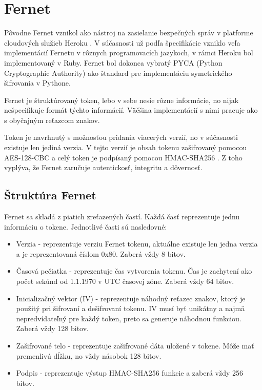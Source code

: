 \section{Fernet}

Pôvodne Fernet vznikol ako nástroj na zasielanie bezpečných správ v platforme cloudových služieb Heroku \cite{fernet_legacy}. V súčasnosti už podľa špecifikácie \cite{fernet_spec} vzniklo veľa implementácií Fernetu v rôznych programovacích jazykoch\cite{fernet_cpp, fernet_haskell}, v rámci Heroku bol implementovaný v Ruby. Fernet bol dokonca vybratý PYCA (Python Cryptographic Authority) \cite{pyca_crypto} ako štandard pre implementáciu symetrického šifrovania v Pythone.

Fernet je štruktúrovaný token, lebo v sebe nesie rôzne informácie, no nijak nešpecifikuje formát týchto informácií. Väčšina implementácií s nimi pracuje ako s obyčajným reťazcom znakov. 

Token je navrhnutý s možnosťou pridania viacerých verzií, no v súčasnosti existuje len jediná verzia. V tejto verzií je obsah tokenu zašifrovaný pomocou AES-128-CBC \cite{aes_cbc} a celý token je podpísaný pomocou HMAC-SHA256 \cite{hmac}. Z toho vyplýva, že Fernet zaručuje autentickosť, integritu a dôvernosť.

\subsection{Štruktúra Fernet}

Fernet sa skladá z piatich zreťazených častí. Každá časť reprezentuje jednu informáciu o tokene. Jednotlivé časti sú nasledovné:

\begin{itemize}
    \item Verzia - reprezentuje verziu Fernet tokenu, aktuálne existuje len jedna verzia a je reprezentovaná číslom 0x80. Zaberá vždy 8 bitov.
    \item Časová pečiatka - reprezentuje čas vytvorenia tokenu. Čas je zachytení ako počet sekúnd od 1.1.1970 v UTC časovej zóne. Zaberá vždy 64 bitov.
    \item Inicializačný vektor (IV) - reprezentuje náhodný reťazec znakov, ktorý je použitý pri šifrovaní a dešifrovaní tokenu. IV musí byť unikátny a najmä nepredvídateľný pre každý token, preto sa generuje náhodnou funkciou. Zaberá vždy 128 bitov.
    \item Zašifrované telo - reprezentuje zašifrované dáta uložené v tokene. Môže mať premenlivú dĺžku, no vždy násobok 128 bitov.
    \item Podpis - reprezentuje výstup HMAC-SHA256 funkcie a zaberá vždy 256 bitov.
\end{itemize}

